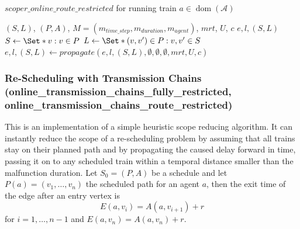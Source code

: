 \documentclass{article}
\DeclareMathOperator{\dom}{dom}
\begin{document}
\begin{algorithm}
	\caption{$scoper\_online\_route\_restricted$ for running train $a \in \dom(\mathcal{A})$} \label{algo:scoper_online_route_restricted}
	\begin{algorithmic}[1]
		\Require $(S,L)$, $(P,A)$, $M=(m_{time\_step},m_{duration},m_{agent})$, $mrt$, $U$, $c$
	    \Ensure $e,l,(S,L)$
        \State $S \leftarrow \Set*{v: v\in P}$
        \State $L \leftarrow \Set*{(v,v^\prime) \in P: v,v^\prime \in S}$
        \State $e,l,(S,L) \leftarrow propagate(e,l,(S,L),\emptyset, \emptyset, \emptyset, mrt, U, c)$
	\end{algorithmic}
\end{algorithm}


\subsubsection{Re-Scheduling with Transmission Chains\\ (online\_transmission\_chains\_fully\_restricted,\\online\_transmission\_chains\_route\_restricted)}
\label{subsubsec:scope_online_tranmission_chains}

This is an implementation of a simple heuristic scope reducing algorithm. It can instantly reduce the scope of a re-scheduling problem by assuming that all trains stay on their planned path and by propagating the caused delay forward in time, passing it on to any scheduled train within a temporal distance smaller than the malfunction duration.
%
Let $S_0=(P,A)$ be a schedule and let $P(a) = (v_1,\ldots,v_n)$ the scheduled path for an agent $a$, then  the exit time of the edge after an entry vertex is
\begin{equation}
E(a,v_i) = A(a,v_{i+1}) + r
\end{equation}
for $i=1,\ldots,n-1$ and $E(a,v_n) = A(a,v_n)+r$.
\end{document}
